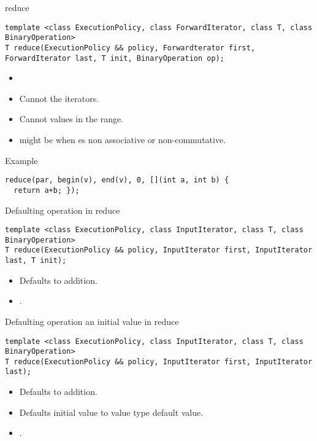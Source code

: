 \begin{frame}[t,fragile]{reduce}
\begin{lstlisting}[]
template <class ExecutionPolicy, class ForwardIterator, class T, class BinaryOperation>
T reduce(ExecutionPolicy && policy, Forwardterator first, ForwardIterator last, T init, BinaryOperation op);
\end{lstlisting}
\begin{itemize}
  \item {}
  \item {} Cannot  the iterators.
  \item {} Cannot  values in the range.
  \item {} might be  when  es non associative or non-commutative.
\end{itemize}
\begin{block}{Example}
\begin{lstlisting}[]
reduce(par, begin(v), end(v), 0, [](int a, int b) { 
  return a+b; });
\end{lstlisting}
\end{block}
\end{frame}

\begin{frame}[t,fragile]{Defaulting operation in reduce}
\begin{lstlisting}[]
template <class ExecutionPolicy, class InputIterator, class T, class BinaryOperation>
T reduce(ExecutionPolicy && policy, InputIterator first, InputIterator last, T init);
\end{lstlisting}
\begin{itemize}
  \item Defaults to addition.
  \item {}.
\end{itemize}
\end{frame}

\begin{frame}[t,fragile]{Defaulting operation an initial value in reduce}
\begin{lstlisting}[]
template <class ExecutionPolicy, class InputIterator, class T, class BinaryOperation>
T reduce(ExecutionPolicy && policy, InputIterator first, InputIterator last);
\end{lstlisting}
\begin{itemize}
  \item Defaults to addition.
  \item Defaults initial value to value type default value.
  \item {}.
\end{itemize}
\end{frame}

